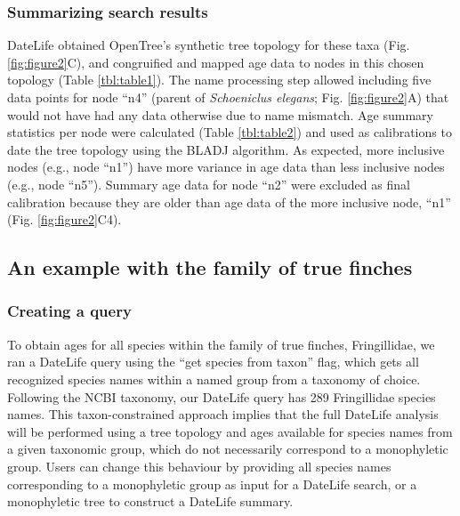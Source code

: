 \documentclass[english,man]{apa6}
\begin{document}
\hypertarget{summarizing-search-results-1}{%
\subsubsection{Summarizing search results}\label{summarizing-search-results-1}}

DateLife obtained OpenTree's synthetic tree topology for these taxa (Fig. \ref{fig:figure2}C), and congruified and mapped age data to nodes in this chosen topology (Table \ref{tbl:table1}).
The name processing step allowed including five data points for node \enquote{n4} (parent of \emph{Schoeniclus elegans}; Fig. \ref{fig:figure2}A) that would not have had any data otherwise due to name mismatch.
Age summary statistics per node were calculated (Table \ref{tbl:table2}) and used as calibrations to date the tree topology using the BLADJ algorithm.
As expected, more inclusive nodes (e.g., node \enquote{n1}) have more variance in age data than less inclusive nodes (e.g., node \enquote{n5}).
Summary age data for node \enquote{n2} were excluded as final calibration because they are older than age data of the more inclusive node, \enquote{n1} (Fig. \ref{fig:figure2}C4).

\newpage

\hypertarget{an-example-with-the-family-of-true-finches}{%
\subsection{An example with the family of true finches}\label{an-example-with-the-family-of-true-finches}}

\hypertarget{creating-a-query}{%
\subsubsection{Creating a query}\label{creating-a-query}}

To obtain ages for all species within the family of true finches, Fringillidae, we ran a DateLife query using the \enquote{get species from taxon} flag,
which gets all recognized species names within a named group from a taxonomy of choice.
Following the NCBI taxonomy, our DateLife query has 289 Fringillidae species names.
This taxon-constrained approach implies that the full DateLife analysis will be performed using a tree topology and ages available for species names from a given taxonomic group, which do not necessarily correspond to a monophyletic group. Users can change this behaviour by providing all species names corresponding to a monophyletic group as input for a DateLife search, or a monophyletic tree to construct a DateLife summary.
\end{document}
